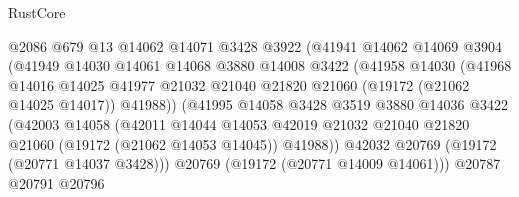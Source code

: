 \begin{lexlean}{RustCore}
\begin{coremodule}
                                @2086
                                @679
                                @13
                                @14062
                                @14071
                                @3428
                                @3922
                                (@41941
                                  @14062
                                  @14069
                                  @3904
                                  (@41949
                                    @14030
                                    @14061
                                    @14068
                                    @3880
                                    @14008
                                    @3422
                                    (@41958
                                      @14030
                                      (@41968
                                        @14016
                                        @14025
                                        @41977
                                        @21032
                                        @21040
                                        @21820
                                        @21060
                                        (@19172 (@21062 @14025 @14017))
                                        @41988))
                                    (@41995
                                      @14058
                                      @3428
                                      @3519
                                      @3880
                                      @14036
                                      @3422
                                      (@42003
                                        @14058
                                        (@42011
                                          @14044
                                          @14053
                                          @42019
                                          @21032
                                          @21040
                                          @21820
                                          @21060
                                          (@19172 (@21062 @14053 @14045))
                                          @41988))
                                      @42032
                                      @20769
                                      (@19172 (@20771 @14037 @3428)))
                                    @20769
                                    (@19172 (@20771 @14009 @14061)))
                                  @20787
                                  @20791
                                  @20796

\end{coremodule}
\end{lexlean}
